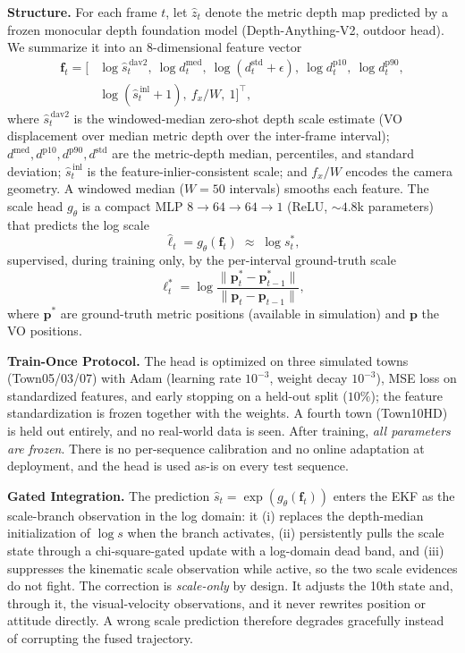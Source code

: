 \textbf{Structure.} For each frame $t$, let $\hat z_t$ denote the metric depth map predicted by a frozen monocular depth foundation model (Depth-Anything-V2, outdoor head). We summarize it into an 8-dimensional feature vector
\begin{align}
    \mathbf{f}_t = \big[&\log \hat s^{\,\mathrm{dav2}}_t,\ \log d^{\mathrm{med}}_t,\ \log (d^{\mathrm{std}}_t{+}\epsilon),\ \log d^{\mathrm{p10}}_t,\ \log d^{\mathrm{p90}}_t, \nonumber\\
    &\log (\hat s^{\,\mathrm{inl}}_t{+}1),\ f_x/W,\ 1\big]^{\top},
    \label{eq:scale_feat}
\end{align}
where $\hat s^{\,\mathrm{dav2}}_t$ is the windowed-median zero-shot depth scale estimate (VO displacement over median metric depth over the inter-frame interval); $d^{\mathrm{med}}, d^{\mathrm{p10}}, d^{\mathrm{p90}}, d^{\mathrm{std}}$ are the metric-depth median, percentiles, and standard deviation; $\hat s^{\,\mathrm{inl}}_t$ is the feature-inlier-consistent scale; and $f_x/W$ encodes the camera geometry. A windowed median ($W{=}50$ intervals) smooths each feature. The scale head $g_\theta$ is a compact MLP $8{\to}64{\to}64{\to}1$ (ReLU, ${\sim}4.8$k parameters) that predicts the log scale
\begin{equation}
    \hat \ell_t = g_\theta(\mathbf{f}_t) \;\approx\; \log s^{*}_t,
    \label{eq:scale_head}
\end{equation}
supervised, during training only, by the per-interval ground-truth scale
\begin{equation}
    \ell^{*}_t = \log \frac{\lVert \mathbf{p}^{*}_t - \mathbf{p}^{*}_{t-1} \rVert}{\lVert \mathbf{p}_t - \mathbf{p}_{t-1} \rVert},
    \label{eq:scale_sup}
\end{equation}
where $\mathbf{p}^{*}$ are ground-truth metric positions (available in simulation) and $\mathbf{p}$ the VO positions.

\textbf{Train-Once Protocol.} The head is optimized on three simulated towns (Town05/03/07) with Adam (learning rate $10^{-3}$, weight decay $10^{-3}$), MSE loss on standardized features, and early stopping on a held-out split ($10\%$); the feature standardization is frozen together with the weights. A fourth town (Town10HD) is held out entirely, and no real-world data is seen. After training, \emph{all parameters are frozen}. There is no per-sequence calibration and no online adaptation at deployment, and the head is used as-is on every test sequence.

\textbf{Gated Integration.} The prediction $\hat s_t = \exp(g_\theta(\mathbf{f}_t))$ enters the EKF as the scale-branch observation in the log domain: it (i) replaces the depth-median initialization of $\log s$ when the branch activates, (ii) persistently pulls the scale state through a chi-square-gated update with a log-domain dead band, and (iii) suppresses the kinematic scale observation while active, so the two scale evidences do not fight. The correction is \emph{scale-only} by design. It adjusts the 10th state and, through it, the visual-velocity observations, and it never rewrites position or attitude directly. A wrong scale prediction therefore degrades gracefully instead of corrupting the fused trajectory.

